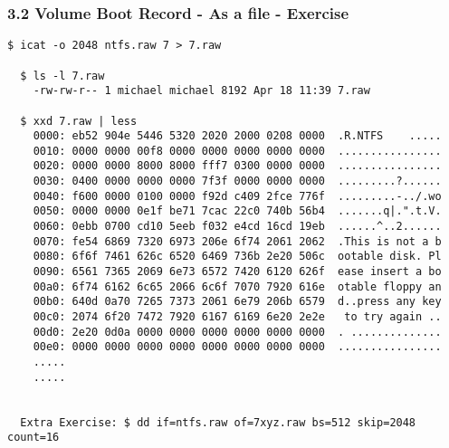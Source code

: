 \begin{frame}[fragile]
  \frametitle{3.2 Volume Boot Record - As a file - Exercise}
  \begin{lstlisting}[basicstyle=\tiny]
  $ icat -o 2048 ntfs.raw 7 > 7.raw

  $ ls -l 7.raw 
	-rw-rw-r-- 1 michael michael 8192 Apr 18 11:39 7.raw

  $ xxd 7.raw | less
	0000: eb52 904e 5446 5320 2020 2000 0208 0000  .R.NTFS    .....
	0010: 0000 0000 00f8 0000 0000 0000 0000 0000  ................
	0020: 0000 0000 8000 8000 fff7 0300 0000 0000  ................
	0030: 0400 0000 0000 0000 7f3f 0000 0000 0000  .........?......
	0040: f600 0000 0100 0000 f92d c409 2fce 776f  .........-../.wo
	0050: 0000 0000 0e1f be71 7cac 22c0 740b 56b4  .......q|.".t.V.
	0060: 0ebb 0700 cd10 5eeb f032 e4cd 16cd 19eb  ......^..2......
	0070: fe54 6869 7320 6973 206e 6f74 2061 2062  .This is not a b
	0080: 6f6f 7461 626c 6520 6469 736b 2e20 506c  ootable disk. Pl
	0090: 6561 7365 2069 6e73 6572 7420 6120 626f  ease insert a bo
	00a0: 6f74 6162 6c65 2066 6c6f 7070 7920 616e  otable floppy an
	00b0: 640d 0a70 7265 7373 2061 6e79 206b 6579  d..press any key
	00c0: 2074 6f20 7472 7920 6167 6169 6e20 2e2e   to try again ..
	00d0: 2e20 0d0a 0000 0000 0000 0000 0000 0000  . ..............
	00e0: 0000 0000 0000 0000 0000 0000 0000 0000  ................
	.....
	.....


  Extra Exercise: $ dd if=ntfs.raw of=7xyz.raw bs=512 skip=2048 count=16
  \end{lstlisting}
\end{frame}


